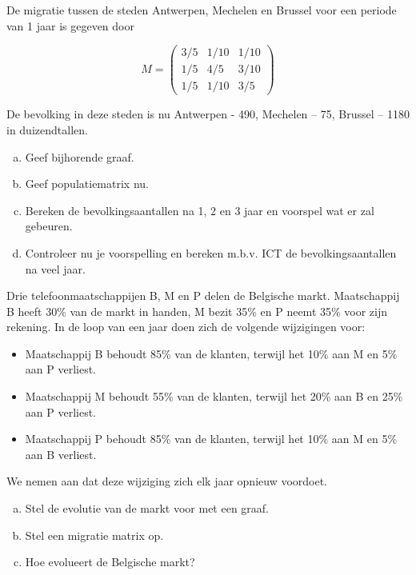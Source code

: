 \documentclass[12pt,twoside]{article}
\begin{document}
\begin{oefening}
De migratie tussen de steden Antwerpen, Mechelen en Brussel  voor een periode van 1 jaar
is gegeven door

$$
M = \begin{pmatrix}
  3/5 & 1/10 & 1/10\\
  1/5 & 4/5  & 3/10\\
  1/5 & 1/10 & 3/5
\end{pmatrix}
$$

De bevolking in deze steden is nu Antwerpen - 490, Mechelen – 75, Brussel – 1180 in duizendtallen.

\begin{enumerate}[(a)]
  \item Geef bijhorende graaf.
  \item Geef populatiematrix nu.
  \item Bereken de bevolkingsaantallen na 1, 2 en 3 jaar en voorspel wat er zal gebeuren.
  \item Controleer nu je voorspelling en bereken m.b.v. ICT de bevolkingsaantallen na veel jaar.
\end{enumerate}
\end{oefening}

\begin{oefening}%
Drie telefoonmaatschappijen B, M en P delen de Belgische markt. Maatschappij B heeft 30\% van de markt in handen, M bezit 35\% en P neemt 35\% voor zijn rekening. In de loop van een jaar doen zich de volgende wijzigingen voor:
\begin{itemize}
  \item Maatschappij B behoudt 85\% van de klanten, terwijl het 10\% aan M en 5\% aan P verliest.
  \item Maatschappij M behoudt 55\% van de klanten, terwijl het 20\% aan B en 25\% aan P verliest.
  \item Maatschappij P behoudt 85\% van de klanten, terwijl het 10\% aan M en 5\% aan B verliest.
\end{itemize}
We nemen aan dat deze wijziging zich elk jaar opnieuw voordoet.

\begin{enumerate}[(a)]
  \item Stel de evolutie van de markt voor met een graaf.
  \item Stel een migratie matrix op.
  \item Hoe evolueert de Belgische markt?
\end{enumerate}
\end{oefening}
\end{document}
